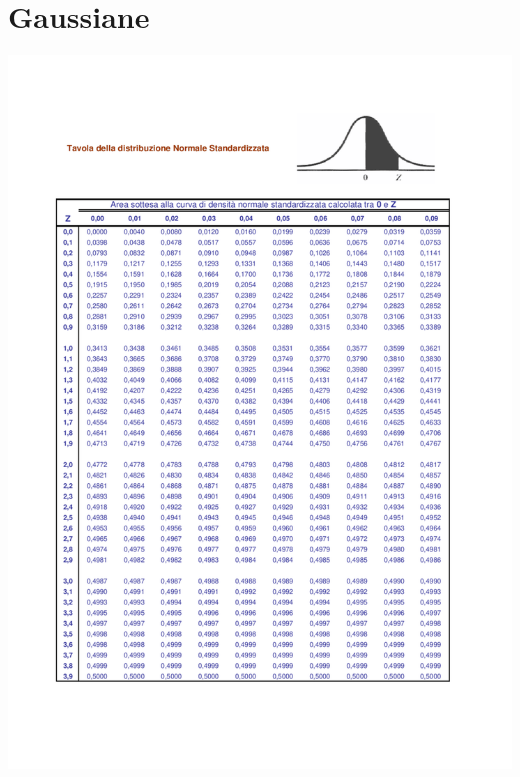 \documentclass[11pt]{article}
\begin{document}
    \appendix

    \section{Gaussiane}

    \begin{minipage}{.99\textwidth}
        \centering
        \includegraphics[width = .99\textwidth]{img/tab_gaus1}
    \end{minipage}
    \newpage
\end{document}
